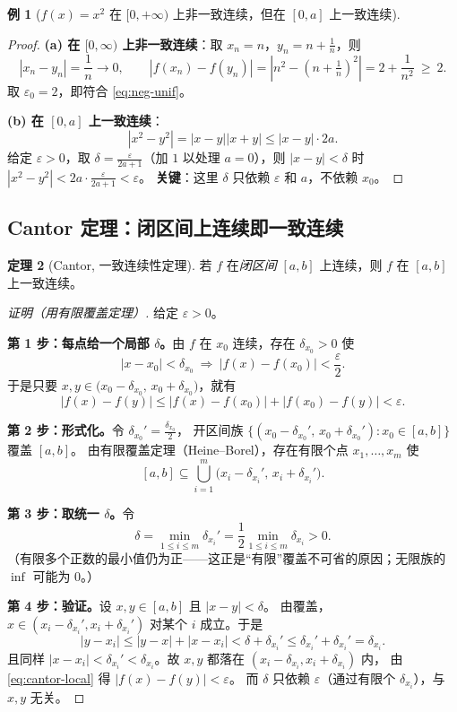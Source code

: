 \documentclass[11pt,a4paper]{ctexart}
\theoremstyle{definition}
\newtheorem{theorem}{定理}[section]
\newtheorem{example}[theorem]{例}
\theoremstyle{remark}
\newcommand{\eps}{\varepsilon}
\newcommand{\abs}[1]{\left\lvert #1 \right\rvert}
\begin{document}
\begin{example}[{$f(x)=x^2$ 在 $[0,+\infty)$ 上非一致连续，但在 $[0,a]$ 上一致连续}]\label{ex:x2}
\end{example}

\begin{proof}
\textbf{(a) 在 $[0,\infty)$ 上非一致连续}：取 $x_n=n$，$y_n=n+\frac1n$，则
\[
  \abs{x_n-y_n}=\frac1n\to0,\qquad
  \abs{f(x_n)-f(y_n)}=\abs{n^{2}-(n+\tfrac1n)^{2}}
  =2+\frac{1}{n^{2}}\ \ge\ 2 .
\]
取 $\eps_0=2$，即符合 \eqref{eq:neg-unif}。

\textbf{(b) 在 $[0,a]$ 上一致连续}：
\[
  \abs{x^{2}-y^{2}}=\abs{x-y}\abs{x+y}\le\abs{x-y}\cdot 2a .
\]
给定 $\eps>0$，取 $\delta=\frac{\eps}{2a+1}$（加 $1$ 以处理 $a=0$），则 $\abs{x-y}<\delta$ 时
$\abs{x^2-y^2}<2a\cdot\frac{\eps}{2a+1}<\eps$。
\textbf{关键}：这里 $\delta$ 只依赖 $\eps$ 和 $a$，不依赖 $x_0$。

\end{proof}

\subsection{Cantor 定理：闭区间上连续即一致连续}

\begin{theorem}[Cantor, 一致连续性定理]\label{thm:cantor}
若 $f$ 在\emph{闭区间} $[a,b]$ 上连续，则 $f$ 在 $[a,b]$ 上一致连续。
\end{theorem}

\begin{proof}[证明（用有限覆盖定理）]
给定 $\eps>0$。

\textbf{第 1 步：每点给一个局部 $\delta$。}由 $f$ 在 $x_0$ 连续，存在 $\delta_{x_0}>0$ 使
\[
  \abs{x-x_0}<\delta_{x_0}\ \Rightarrow\ \abs{f(x)-f(x_0)}<\frac{\eps}{2} .
\]
于是只要 $x,y\in\bigl(x_0-\delta_{x_0},\,x_0+\delta_{x_0}\bigr)$，就有
\begin{equation}\label{eq:cantor-local}
  \abs{f(x)-f(y)}\le\abs{f(x)-f(x_0)}+\abs{f(x_0)-f(y)}<\eps .
\end{equation}

\textbf{第 2 步：形式化。}令 $\delta_{x_0}'=\frac{\delta_{x_0}}{2}$，
开区间族 $\bigl\{(x_0-\delta_{x_0}',\,x_0+\delta_{x_0}'):x_0\in[a,b]\bigr\}$ 覆盖 $[a,b]$。
由有限覆盖定理（Heine--Borel），存在有限个点 $x_1,\dots,x_m$ 使
\[
  [a,b]\subseteq\bigcup_{i=1}^{m}\bigl(x_i-\delta_{x_i}',\,x_i+\delta_{x_i}'\bigr).
\]

\textbf{第 3 步：取统一 $\delta$。}令
\[
  \delta=\min_{1\le i\le m}\delta_{x_i}'=\frac12\min_{1\le i\le m}\delta_{x_i}>0 .
\]
（有限多个正数的最小值仍为正——这正是“有限”覆盖不可省的原因；无限族的 $\inf$ 可能为 $0$。）

\textbf{第 4 步：验证。}设 $x,y\in[a,b]$ 且 $\abs{x-y}<\delta$。
由覆盖，$x\in(x_i-\delta_{x_i}',x_i+\delta_{x_i}')$ 对某个 $i$ 成立。于是
\[
  \abs{y-x_i}\le\abs{y-x}+\abs{x-x_i}<\delta+\delta_{x_i}'
  \le\delta_{x_i}'+\delta_{x_i}'=\delta_{x_i} .
\]
且同样 $\abs{x-x_i}<\delta_{x_i}'<\delta_{x_i}$。故 $x,y$ 都落在 $(x_i-\delta_{x_i},x_i+\delta_{x_i})$ 内，
由 \eqref{eq:cantor-local} 得 $\abs{f(x)-f(y)}<\eps$。
而 $\delta$ 只依赖 $\eps$（通过有限个 $\delta_{x_i}$），与 $x,y$ 无关。

\end{proof}
\end{document}
